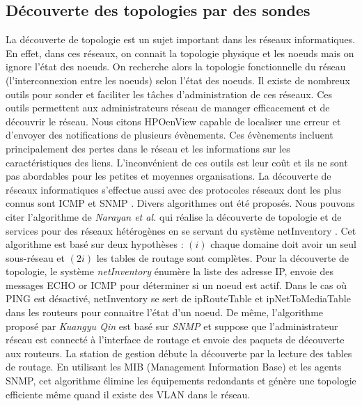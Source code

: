 \subsection{D\'ecouverte des topologies par des sondes}
La d\'ecouverte de topologie est un sujet important dans les r\'eseaux informatiques.
En effet, dans ces r\'eseaux,  on connait la topologie physique et les noeuds mais on ignore l'\'etat des noeuds. On recherche alors la topologie fonctionnelle du r\'eseau (l'interconnexion entre les noeuds) selon l'\'etat des noeuds. 
Il existe de nombreux outils pour sonder et faciliter les t\^aches d'administration de ces r\'eseaux. 
Ces outils permettent aux administrateurs r\'eseau de manager efficacement et de d\'ecouvrir le r\'eseau.
Nous citons HPOenView \cite{OpenView} capable de localiser une erreur et d'envoyer des notifications de plusieurs \'ev\`enements. Ces \'ev\`enements incluent principalement des pertes dans le r\'eseau et les informations sur les caract\'eristiques des liens.
L'inconv\'enient de ces outils est leur co\^ut et ils ne sont pas abordables pour les petites et moyennes organisations.
La d\'ecouverte de r\'eseaux informatiques s'effectue  aussi avec des protocoles r\'eseaux dont les plus connus sont ICMP \cite{rfc792} et SNMP \cite{rfc2821}.
Divers algorithmes ont \'et\'e propos\'es. 
Nous pouvons citer l'algorithme de {\em Narayan et al.} \cite{Breitbart:2004:TDH:1008463.1008464} qui r\'ealise la d\'ecouverte de topologie et de services pour des r\'eseaux h\'et\'erog\`enes en se servant du syst\`eme netInventory \cite{netInventory}. 
Cet algorithme est bas\'e sur deux hypoth\`eses : 
$(i)$ chaque domaine doit avoir un seul sous-r\'eseau et 
$(2i)$ les tables de routage sont compl\`etes. 
Pour la d\'ecouverte de topologie, le syst\`eme {\em netInventory} \'enum\`ere la liste des adresse IP, envoie des messages ECHO or ICMP pour d\'eterminer si un noeud est actif. Dans le cas o\`u PING est d\'esactiv\'e, netInventory se sert de ipRouteTable et ipNetToMediaTable dans les routeurs pour connaitre l'\'etat d'un noeud.
\newline
De m\^eme, l'algorithme propos\'e par {\em Kuangyu Qin} \cite{QinKuangyuChunquan2010} est bas\'e sur {\em SNMP} et suppose que l'administrateur r\'eseau est connect\'e \`a l'interface de routage et envoie des paquets de d\'ecouverte aux routeurs. La station de gestion d\'ebute la d\'ecouverte par la lecture des tables de routage. En utilisant les MIB (Management Information Base) et les agents SNMP, cet algorithme \'elimine les \'equipements redondants et g\'en\`ere une topologie efficiente m\^eme quand il existe des VLAN dans le r\'eseau.
